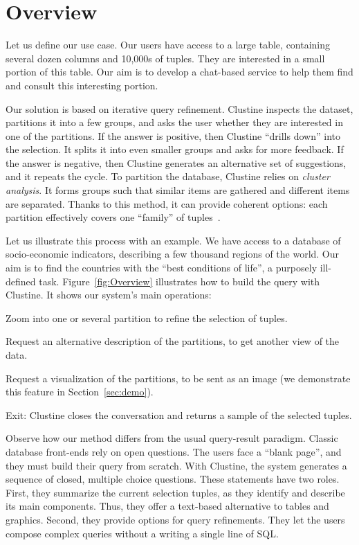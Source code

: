 \section{Overview}
\label{sec:overview}

Let us define our use case. Our users have access to a large table, containing
several dozen columns and 10,000s of tuples. They are interested in a small
portion of this table.  Our aim is to develop a chat-based service to help them
find and consult this interesting portion.

Our solution is based on iterative query refinement. Clustine inspects the
dataset, partitions it into a few groups, and asks the user whether they are
interested in one of the partitions. If the answer is positive, then Clustine
``drills down'' into the selection. It splits it into even smaller groups and asks for
more feedback.  If the answer is negative, then Clustine generates an
alternative set of suggestions, and it repeats the cycle.  To partition the
database, Clustine relies on \emph{cluster analysis}. It forms groups such that
similar items are gathered and different items are separated.  Thanks to this
method, it can provide coherent options: each partition effectively covers one
``family'' of tuples~\cite{sellamTKDE}.

Let us illustrate this process with an example. We have access to a database of
socio-economic indicators, describing a few thousand regions of the world.  Our
aim is to find the countries with the ``best conditions of life'', a purposely
ill-defined task.  Figure~\ref{fig:Overview} illustrates how to build the query
with Clustine.  It shows our system's main operations: 
\begin{itemize0}
    \item Zoom into one or several partition to refine the selection of
        tuples. 
    \item Request an alternative description of
        the partitions, to get another view of the data.
    \item Request a visualization of the partitions, to be sent as an
        image (we demonstrate this feature in
        Section~\ref{sec:demo}).
    \item Exit: Clustine closes the conversation and returns
        a sample of the selected tuples.
\end{itemize0}
Observe how our method differs from the usual query-result paradigm. Classic
database front-ends rely on open questions. The users face a ``blank page'',
and they must build their query from scratch.  With Clustine, the system
generates a sequence of closed, multiple choice questions. These
statements have two roles. First, they summarize the current selection tuples,
as they identify and describe its main components. Thus, they offer a
text-based alternative to tables and graphics. Second, they provide options for
query refinements. They let the users compose complex queries without a writing
a single line of SQL.


